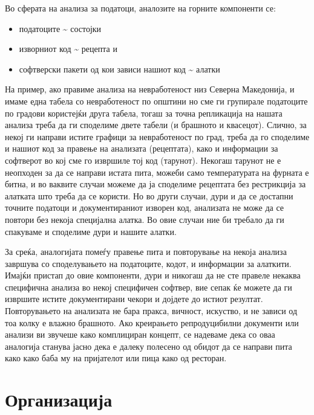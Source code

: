 \documentclass[
]{book}
\providecommand{\tightlist}{%
  \setlength{\itemsep}{0pt}\setlength{\parskip}{0pt}}
\begin{document}
Во сферата на анализа за податоци, аналозите на горните компоненти се:

\begin{itemize}
\tightlist
\item
  податоците \textasciitilde{} состојки\\
\item
  изворниот код \textasciitilde{} рецепта и\\
\item
  софтверски пакети од кои зависи нашиот код \textasciitilde{} алатки
\end{itemize}

На пример, ако правиме анализа на невработеност низ Северна Македонија, и имаме една табела со невработеност по општини но сме ги групирале податоците по градови користејќи друга табела, тогаш за точна репликација на нашата анализа треба да ги споделиме двете табели (и брашното и квасецот). Слично, за некој ги направи истите графици за невработеност по град, треба да го споделиме и нашиот код за правење на анализата (рецептата), како и информации за софтверот во кој сме го извршиле тој код (тарунот). Некогаш тарунот не е неопходен за да се направи истата пита, можеби само температурата на фурната е битна, и во ваквите случаи можеме да ја споделиме рецептата без рестрикција за алатката што треба да се користи. Но во други случаи, дури и да се достапни точните податоци и документираниот изворен код, анализата не може да се повтори без некоја специјална алатка. Во овие случаи ние би требало да ги спакуваме и споделиме дури и нашите алатки.

За среќа, аналогијата помеѓу правење пита и повторување на некоја анализа завршува со споделувањето на податоците, кодот, и информации за алаткити. Имајќи пристап до овие компоненти, дури и никогаш да не сте правеле некаква специфична анализа во некој специфичен софтвер, вие сепак ќе можете да ги извршите истите документирани чекори и дојдете до истиот резултат. Повторувањето на анализата не бара пракса, вичност, искуство, и не зависи од тоа колку е влажно брашното. Ако креирањето репродуцибилни документи или анализи ви звучеше како комплициран концепт, се надеваме дека со оваа аналогија станува јасно дека е далеку полесено од обидот да се направи пита како како баба му на пријателот или пица како од ресторан.

\hypertarget{organ}{%
\section{Организација}\label{organ}}
\end{document}
